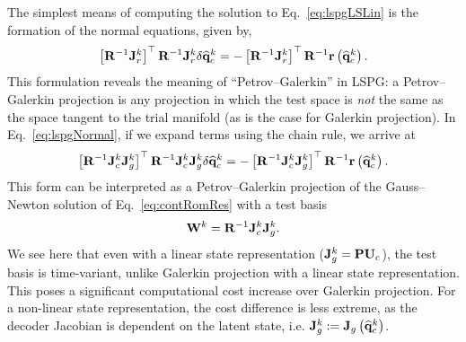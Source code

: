 The simplest means of computing the solution to Eq.~\ref{eq:lspgLSLin} is the formation of the normal equations, given by,
%
\begin{equation}\label{eq:lspgNormal}
    \left[\resScaleInv \jacobRes^{\newtonIdx}\right]^\top \resScaleInv \jacobRes^{\newtonIdx} \delta \consVecCoef^{\newtonIdx} = -\left[\resScaleInv \jacobRes^{\newtonIdx}\right]^\top \resScaleInv \resFunc{\consVecCoef^{\newtonIdx}}.
\end{equation}
%
This formulation reveals the meaning of ``Petrov--Galerkin'' in LSPG: a Petrov--Galerkin projection is any projection in which the test space is \textit{not} the same as the space tangent to the trial manifold (as is the case for Galerkin projection). In Eq.~\ref{eq:lspgNormal}, if we expand terms using the chain rule, we arrive at
%
\begin{equation}
    \left[\resScaleInv \jacobCons^{\newtonIdx} \jacobDecode^{\newtonIdx}\right]^\top \resScaleInv \jacobCons^{\newtonIdx} \jacobDecode^{\newtonIdx} \delta \consVecCoef^{\newtonIdx} = -\left[\resScaleInv \jacobCons^{\newtonIdx} \jacobDecode^{\newtonIdx}\right]^\top \resScaleInv \resFunc{\consVecCoef^{\newtonIdx}}.
\end{equation}
%
This form can be interpreted as a Petrov--Galerkin projection of the Gauss--Newton solution of Eq.~\ref{eq:contRomRes} with a test basis
%
\begin{equation}
    \testBasis^\newtonIdx = \resScaleInv \jacobCons^\newtonIdx \jacobDecode^{\newtonIdx}.
\end{equation}
%
We see here that even with a linear state representation ($\jacobDecode^{\newtonIdx} = \consScale \consTrial$), the test basis is time-variant, unlike Galerkin projection with a linear state representation. This poses a significant computational cost increase over Galerkin projection. For a non-linear state representation, the cost difference is less extreme, as the decoder Jacobian is dependent on the latent state, i.e. $\mathbf{J}_{g}^{k} := \mathbf{J}_{g} \left(\mathbf{\widehat{q}}_{c}^{k}\right)$.

